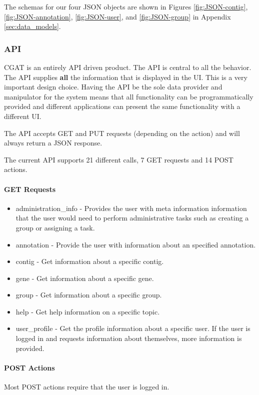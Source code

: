 \documentclass[10pt, conference, compsocconf]{IEEEtran}
\begin{document}
The schemas for our four JSON objects are shown in Figures \ref{fig:JSON-contig}, \ref{fig:JSON-annotation},
\ref{fig:JSON-user}, and \ref{fig:JSON-group} in Appendix \ref{sec:data_models}.

\subsubsection{API}
CGAT is an entirely API driven product. The API is central to all the behavior.
The API supplies \textbf{all} the information that is displayed in the UI.
This is a very important design choice. Having the API be the sole data provider and manipulator for the system
means that all functionality can be programmatically provided and different applications can present the same
functionality with a different UI.

The API accepts GET and PUT requests (depending on the action) and will always return a JSON response.

The current API supports 21 different calls, 7 GET requests and 14 POST actions.

\paragraph{GET Requests}
\begin{itemize}
\item administration\_info - Provides the user with meta information information that the user would need to perform administrative tasks such as creating a group or assigning a task.
\item annotation - Provide the user with information about an specified annotation.
\item contig - Get information about a specific contig.
\item gene - Get information about a specific gene.
\item group - Get information about a specific group.
\item help - Get help information on a specific topic.
\item user\_profile - Get the profile information about a specific user. If the user is logged in and requests information about themselves, more information is provided.
\end{itemize}

\paragraph{POST Actions}
Most POST actions require that the user is logged in.
\end{document}
